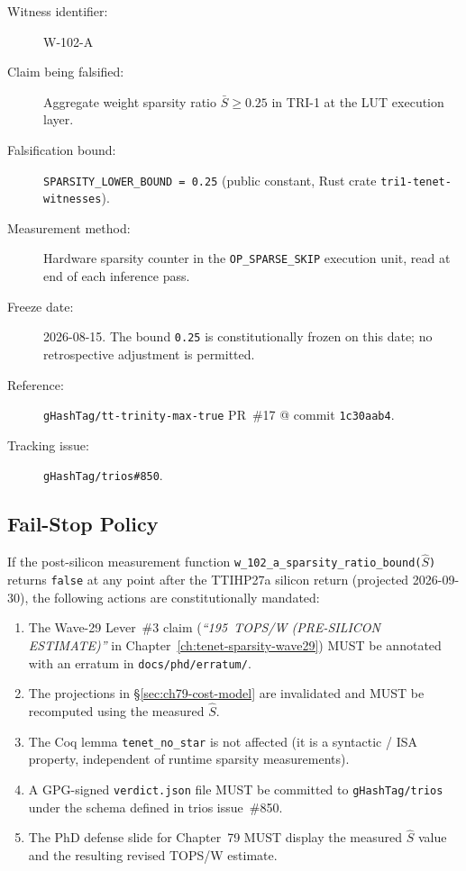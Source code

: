 \begin{description}
  \item[Witness identifier:] W-102-A
  \item[Claim being falsified:] Aggregate weight sparsity ratio
        $\bar{S} \geq 0.25$ in TRI-1 at the LUT execution layer.
  \item[Falsification bound:] \texttt{SPARSITY\_LOWER\_BOUND = 0.25}
        (public constant, Rust crate \texttt{tri1-tenet-witnesses}).
  \item[Measurement method:] Hardware sparsity counter in the
        \texttt{OP\_SPARSE\_SKIP} execution unit, read at end of
        each inference pass.
  \item[Freeze date:] 2026-08-15.
        The bound \texttt{0.25} is constitutionally frozen on this
        date; no retrospective adjustment is permitted.
  \item[Reference:] \texttt{gHashTag/tt-trinity-max-true} PR~\#17
        @ commit \texttt{1c30aab4}.
  \item[Tracking issue:] \texttt{gHashTag/trios\#850}.
\end{description}

\subsection{Fail-Stop Policy}
\label{subsec:ch79-fail-stop}

If the post-silicon measurement function
\texttt{w\_102\_a\_sparsity\_ratio\_bound($\hat{S}$)} returns
\texttt{false} at any point after the TTIHP27a silicon return
(projected 2026-09-30), the following actions are constitutionally
mandated:

\begin{enumerate}
  \item The Wave-29 Lever~\#3 claim (\textit{``195~TOPS/W (PRE-SILICON ESTIMATE)''}
        in Chapter~\ref{ch:tenet-sparsity-wave29}) MUST be annotated
        with an erratum in \texttt{docs/phd/erratum/}.
  \item The projections in §\ref{sec:ch79-cost-model} are invalidated
        and MUST be recomputed using the measured $\hat{S}$.
  \item The Coq lemma \texttt{tenet\_no\_star} is not affected
        (it is a syntactic / ISA property, independent of runtime
        sparsity measurements).
  \item A GPG-signed \texttt{verdict.json} file MUST be committed to
        \texttt{gHashTag/trios} under the schema defined in
        trios issue~\#850.
  \item The PhD defense slide for Chapter~79 MUST display the
        measured $\hat{S}$ value and the resulting revised TOPS/W estimate.
\end{enumerate}

